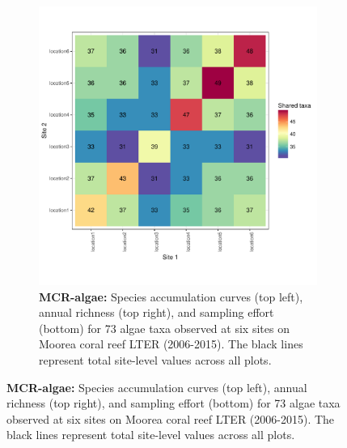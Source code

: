 \documentclass[11pt, oneside]{article}
\begin{document}
\begin{figure}[h!]
\begin{figure}[h!]
\includegraphics[scale = 0.4]{mcr-algae-castorani_spp_shared.pdf}
\caption{{\bf MCR-algae:} Species accumulation curves (top left),  annual richness (top right), and sampling effort (bottom)  for 73 algae taxa observed at six sites on Moorea coral reef LTER (2006-2015). The black lines represent total site-level values across all plots.}
\label{mcr-algae}
\end{figure}




\end{figure}
\end{document}
